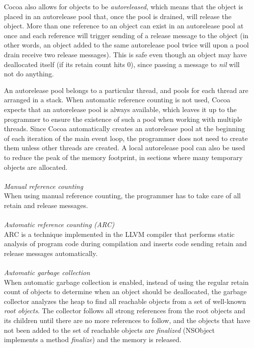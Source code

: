 \documentclass[a4paper]{article}
\begin{document}
Cocoa also allows for objects to be \textit{autoreleased}, which means that the object is placed in an autorelease pool that, once the pool is drained, will release the object. More than one reference to an object can exist in an autorelease pool at once and each reference will trigger sending of a release message to the object (in other words, an object added to the same autorelease pool twice will upon a pool drain receive two release messages). This is safe even though an object may have deallocated itself (if its retain count hits 0), since passing a message to \textit{nil} will not do anything.

An autorelease pool belongs to a particular thread, and pools for each thread are arranged in a stack. When  automatic reference counting is not used, Cocoa expects that an autorelease pool is always available, which leaves it up to the programmer to ensure the existence of such a pool when working with multiple threads. Since Cocoa automatically creates an autorelease pool at the beginning of each iteration of the main event loop, the programmer does not need to create them unless other threads are created. A local autorelease pool can also be used to reduce the peak of the memory footprint, in sections where many temporary objects are allocated.
\\ \\ \textit{Manual reference counting} \\
When using manual reference counting, the programmer has to take care of all retain and release messages.
\\ \\ \textit{Automatic reference counting (ARC)} \\ ARC is a technique implemented in the LLVM compiler \cite{llvmARC} that performs static analysis of program code during compilation and inserts code sending retain and release messages automatically.
\\ \\ \textit{Automatic garbage collection} \\ When automatic garbage collection is enabled, instead of using the regular retain count of objects to determine when an object should be deallocated, the garbage collector analyzes the heap to find all reachable objects from a set of well-known \textit{root objects}. The collector  follows all strong references from the root objects and its children until there are no more references to follow, and the objects that have not been added to the set of reachable objects are \textit{finalized} (NSObject implements a method \textit{finalize}) and the memory is released.
\end{document}
